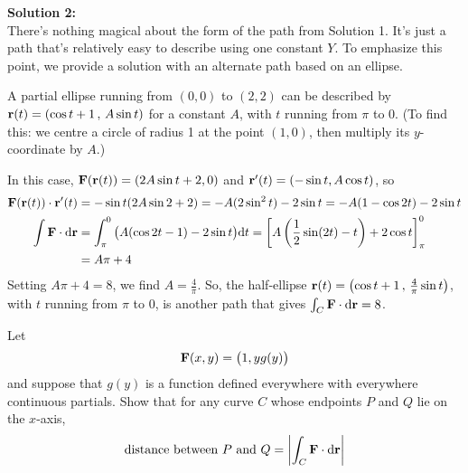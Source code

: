 \begin{solution}
	\textbf{Solution 2:}\\
	There's nothing magical about the form of the path from Solution 1. It's just a path that's relatively easy to describe using one constant $Y$. To emphasize this point, we provide a solution with an alternate path based on an ellipse.
	
	A partial ellipse running from $(0,0)$ to $(2,2)$ can be described by $\mathbf{r}(t)=(\cos t+1\, , \, A\sin t)$ for a constant $A$, with $t$ running from $\pi$ to 0. (To find this: we centre a circle of radius 1 at the point $(1,0)$, then multiply its $y$-coordinate by $A$.)
	
	\begin{center}
	\end{center}
	
	In this case, $\mathbf{F}(\mathbf{r}(t))=(2A\sin t + 2,0)$ and $\mathbf{r}'(t)=(-\sin t , A\cos t)$, so 
	\begin{align*}
	\mathbf{F}(\mathbf{r}(t))\cdot\mathbf{r}'(t)&=-\sin t (2A\sin 2 +2)=-A(2\sin^2t)-2\sin t=-A(1-\cos2t)-2\sin t\\
	\int \mathbf{F} \cdot \mathrm{d}\mathbf{r}&=\int_{\pi}^0\big( A(\cos2t-1)-2\sin t \big)\mathrm{d}t=\left[A\left(\frac12\sin(2t)-t\right) +2\cos t\right]_{\pi}^0\\
	&=A\pi+4
	\end{align*}
	Setting $A\pi+4=8$, we find $A=\frac{4}{\pi}$. So, the half-ellipse $\mathbf{r}(t)=\left(\cos t+1\, , \, \frac{4}{\pi}\sin t\right)$, with $t$ running from $\pi$ to 0, is another path that gives $\int_C \mathbf{F}\cdot\mathrm{d}\mathbf{r}=8$.
\end{solution}

\begin{question}[M317 2010D]  %
Let
\begin{equation*}
\mathbf{F}(x, y) = \big(1, y g(y)\big)
\end{equation*}
and suppose that $g(y)$ is a function defined everywhere with 
everywhere continuous partials.
Show that for any curve $C$ whose endpoints $P$ and $Q$ lie on the $x$-axis,
\begin{equation*}
\text{distance between $P$ and $Q$} =  \left|\int_C\mathbf{F}\cdot\mathrm{d}\mathbf{r}\right|
\end{equation*}
\end{question}


